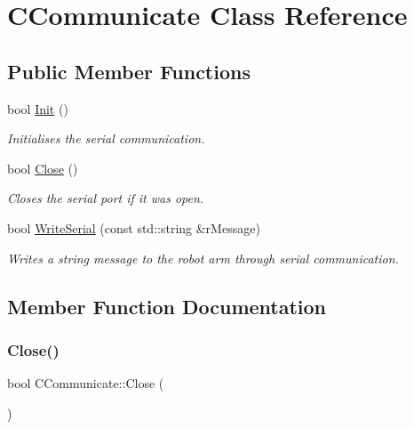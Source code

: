 \hypertarget{classCCommunicate}{}\section{C\+Communicate Class Reference}
\label{classCCommunicate}
\subsection*{Public Member Functions}
\begin{DoxyCompactItemize}
\item 
bool \hyperlink{classCCommunicate_ab410d966213135d9d5c9ede493c5c5d8}{Init} ()
\begin{DoxyCompactList}\small\item\em Initialises the serial communication. \end{DoxyCompactList}\item 
bool \hyperlink{classCCommunicate_ab1eefe862756c613c4d006902badfffa}{Close} ()
\begin{DoxyCompactList}\small\item\em Closes the serial port if it was open. \end{DoxyCompactList}\item 
bool \hyperlink{classCCommunicate_a322f1dc7ffdd18be70e6e6aa9eca3613}{Write\+Serial} (const std\+::string \&r\+Message)
\begin{DoxyCompactList}\small\item\em Writes a string message to the robot arm through serial communication. \end{DoxyCompactList}\end{DoxyCompactItemize}


\subsection{Member Function Documentation}
\mbox{\label{classCCommunicate_ab1eefe862756c613c4d006902badfffa}} 
\subsubsection{\texorpdfstring{Close()}{Close()}}
{\footnotesize\ttfamily bool C\+Communicate\+::\+Close (\begin{DoxyParamCaption}{ }\end{DoxyParamCaption})}



